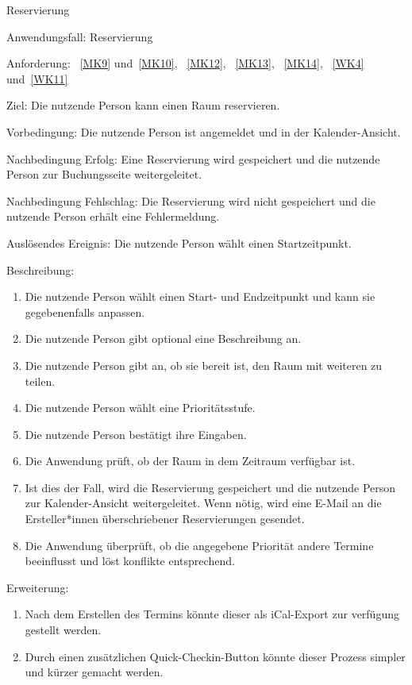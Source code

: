 \begin{function}{40}{Reservierung}
    \item[Anwendungsfall:] Reservierung
    \item[Anforderung:]~\ref{MK9} und~\ref{MK10}, ~\ref{MK12}, ~\ref{MK13}, ~\ref{MK14}, ~\ref{WK4} und~\ref{WK11}
    \item[Ziel:] Die nutzende Person kann einen Raum reservieren.
    \item[Vorbedingung:] Die nutzende Person ist angemeldet und in der Kalender-Ansicht.
    \item[Nachbedingung Erfolg:] Eine Reservierung wird gespeichert und die nutzende Person zur Buchungsseite weitergeleitet.
    \item[Nachbedingung Fehlschlag:] Die Reservierung wird nicht gespeichert und die nutzende Person erhält eine Fehlermeldung.
    \item[Auslösendes Ereignis:] Die nutzende Person wählt einen Startzeitpunkt.
    \item[Beschreibung:] ~
    \begin{enumerate}
        \item Die nutzende Person wählt einen Start- und Endzeitpunkt und kann sie gegebenenfalls anpassen.
        \item Die nutzende Person gibt optional eine Beschreibung an.
        \item Die nutzende Person gibt an, ob sie bereit ist, den Raum mit weiteren zu teilen.
        \item Die nutzende Person wählt eine Prioritätsstufe.
        \item Die nutzende Person bestätigt ihre Eingaben.
        \item Die Anwendung prüft, ob der Raum in dem Zeitraum verfügbar ist.
        \item Ist dies der Fall, wird die Reservierung gespeichert und die nutzende Person zur Kalender-Ansicht weitergeleitet.
        Wenn nötig, wird eine E-Mail an die Ersteller*innen überschriebener Reservierungen gesendet.
        \item Die Anwendung überprüft, ob die angegebene Priorität andere Termine beeinflusst und löst konflikte entsprechend.
    \end{enumerate}
    \item[Erweiterung:]
    \begin{enumerate}
        \item Nach dem Erstellen des Termins könnte dieser als iCal-Export zur verfügung gestellt werden.
        \item Durch einen zusätzlichen Quick-Checkin-Button könnte dieser Prozess simpler und kürzer gemacht werden.
    \end{enumerate}
\end{function}

